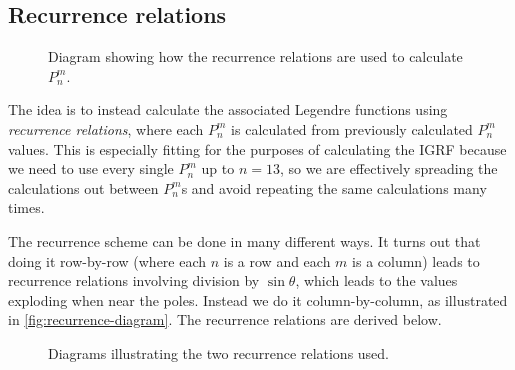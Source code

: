 \documentclass[12pt]{article}
\begin{document}
\subsection{Recurrence relations}
\begin{figure}[htbp]
  \centering
  \caption{Diagram showing how the recurrence relations are used to calculate $P_n^m$.}
  \label{fig:recurrence-diagram}
\end{figure}

The idea is to instead calculate the associated Legendre functions using \textit{recurrence relations}, where each $P_n^m$ is calculated from previously calculated $P_n^m$ values. This is especially fitting for the purposes of calculating the IGRF because we need to use every single $P_n^m$ up to $n=13$, so we are effectively spreading the calculations out between $P_n^m$s and avoid repeating the same calculations many times. 

The recurrence scheme can be done in many different ways. It turns out that doing it row-by-row (where each $n$ is a row and each $m$ is a column) leads to recurrence relations involving division by $\sin\theta$, which leads to the values exploding when near the poles. Instead we do it column-by-column, as illustrated in \autoref{fig:recurrence-diagram}. The recurrence relations are derived below.

\begin{figure}[htbp]
  \centering
  \begin{subfigure}{.49\linewidth}
    \caption{}
  \end{subfigure}
  \begin{subfigure}{.49\linewidth}
    \caption{}
  \end{subfigure}
  \caption{Diagrams illustrating the two recurrence relations used.}
\end{figure}
\end{document}
